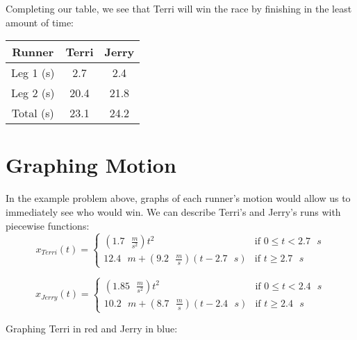 Completing our table, we see that Terri will win the race by finishing in the 
least amount of time:
\begin{center}
\begin{tabular}{|c|c|c|}
\hline
Runner & Terri & Jerry\\\hline
Leg 1 (s) & 2.7 & 2.4 \\\hline
Leg 2 (s) & 20.4 & 21.8 \\\hline
Total (s) & 23.1 & 24.2 \\\hline
\end{tabular}
\end{center}

\section{Graphing Motion}


In the example problem above, graphs of each runner's motion would allow us to 
immediately see who would win. We can describe Terri's and Jerry's runs with 
piecewise functions:
$$x_{Terri}(t) = \begin{cases}
\left( 1.7 \text{ } \frac{m}{s^2} \right)t^2 & \text{if } 0 \leq t < 2.7 
\text{ }s\\
12.4 \text{ } m + \left( 9.2 \text{ } \frac{m}{s} \right) \left( t - 2.7 \text{ } 
s \right) & \text{if } t \geq 2.7 \text{ }s
\end{cases}$$

$$x_{Jerry}(t) = \begin{cases}
\left( 1.85 \text{ } \frac{m}{s^2} \right)t^2 & \text{if } 0 \leq t < 2.4 
\text{ }s\\
10.2 \text{ }m + \left( 8.7 \text{ }\frac{m}{s} \right) \left(t - 2.4 \text{ }s 
\right) & \text{if } t \geq 2.4 \text{ }s
\end{cases}$$

Graphing Terri in red and Jerry in blue:
\begin{center}
\end{center}

